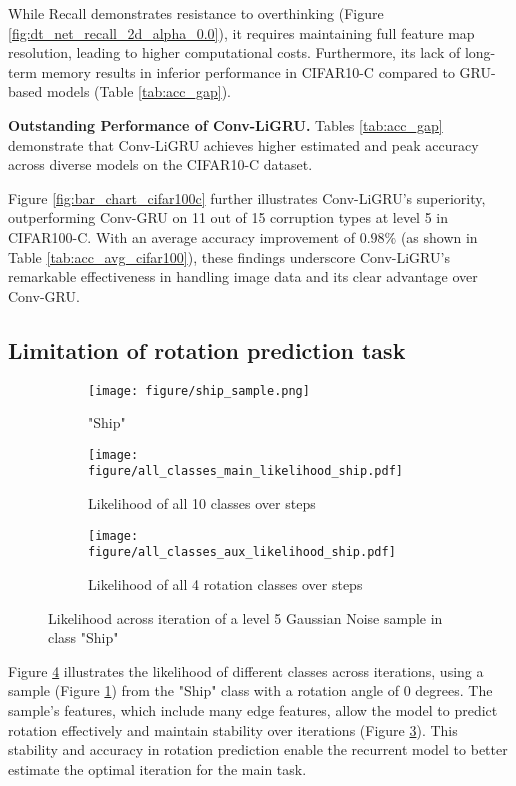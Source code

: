 While Recall demonstrates resistance to overthinking (Figure \ref{fig:dt_net_recall_2d_alpha_0.0}), it requires maintaining full feature map resolution, leading to higher computational costs. Furthermore, its lack of long-term memory results in inferior performance in CIFAR10-C compared to GRU-based models (Table \ref{tab:acc_gap}).

\textbf{Outstanding Performance of Conv-LiGRU.} Tables \ref{tab:acc_gap} demonstrate that Conv-LiGRU achieves higher estimated and peak accuracy across diverse models on the CIFAR10-C dataset. 

Figure \ref{fig:bar_chart_cifar100c} further illustrates Conv-LiGRU's superiority, outperforming Conv-GRU on 11 out of 15 corruption types at level 5 in CIFAR100-C. With an average accuracy improvement of $0.98\%$ (as shown in Table \ref{tab:acc_avg_cifar100}), these findings underscore Conv-LiGRU's remarkable effectiveness in handling image data and its clear advantage over Conv-GRU.

\subsection{Limitation of rotation prediction task}
\begin{figure}[!t]
    \centering
    \begin{subfigure}{0.1\textwidth}
        \texttt{[image: figure/ship\_sample.png]}
        \caption{"Ship"}
        \label{fig:ship_sample}
    \end{subfigure}
    \vfill
    \begin{subfigure}{0.22\textwidth}
        \texttt{[image: figure/all\_classes\_main\_likelihood\_ship.pdf]}
        \caption{Likelihood of all 10 classes over steps}
        \label{fig:all_classes_main_likelihood_hard_ship}
    \end{subfigure}
    \begin{subfigure}{0.22\textwidth}
        \texttt{[image: figure/all\_classes\_aux\_likelihood\_ship.pdf]}
        \caption{Likelihood of all 4 rotation classes over steps}
        \label{fig:all_class_likelihood_aux_hard_ship}
    \end{subfigure}
    \caption{Likelihood across iteration of a level 5 Gaussian Noise sample in class "Ship"}
    \label{fig:likelihood_ship}
\end{figure}
Figure \ref{fig:likelihood_ship} illustrates the likelihood of different classes across iterations, using a sample (Figure \ref{fig:ship_sample}) from the "Ship" class with a rotation angle of 0 degrees. The sample's features, which include many edge features, allow the model to predict rotation effectively and maintain stability over iterations (Figure \ref{fig:all_class_likelihood_aux_hard_ship}). This stability and accuracy in rotation prediction enable the recurrent model to better estimate the optimal iteration for the main task.

